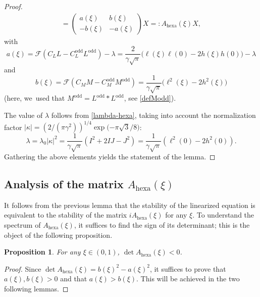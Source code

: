 \documentclass[JEP,XML,SOM,Unicode,NoFloatCountersInSection,published]{cedram}
\newtheorem{prop}[theorem]{Proposition}
\theoremstyle{definition}
\let\EE\exp
\newcommand{\pa}[1]{\left(#1\right)}
\begin{document}
\begin{proof}
\begin{multline}
=\begin{pmatrix} a(\xi) & b(\xi) \\[2pt] -b(\xi) & -a(\xi) \end{pmatrix}X
=:A_{\mathrm{hexa}}(\xi)X,
\end{multline}
with
\begin{equation}\label{def_a_hexa}
a(\xi) = \mathcal{F} \pa{C_L L- C_L^{\text{odd}}L^{\text{odd}}} -\lambda
= \frac{2}{\gamma\sqrt{\pi}}\bigl(\ell(\xi)\ell(0)-2h(\xi)h(0)\bigr) -\lambda
\end{equation}
and
\begin{equation}\label{def_b_hexa}
b(\xi) = \mathcal{F} \pa{C_M M- C_M^{\text{odd}}M^{\text{odd}}}
= \frac{1}{\gamma\sqrt{\pi}}\bigl({\ell^2(\xi)-2h^2(\xi)}\bigr)
\end{equation}
(here, we~used that $M^{\text{odd}} = L^{\text{odd}} * L^{\text{odd}}$, see \eqref{defModd}).

The value of $\lambda$ follows from \eqref{lambda-hexa}, taking into account the normalization factor $|\kappa|= \pa{2/{(\pi\gamma^2)}}^{1/4} \EE\bigl({-{\pi \sqrt{3}}/{8}}\bigr)$:
\begin{equation}\label{def_lambda_hexa}
\lambda = \lambda_0 |\kappa|^2=\frac{1}{\gamma\sqrt{\pi}}\pa{I^2+2IJ-J^2}=\frac{1}{\gamma\sqrt{\pi}}\pa{\ell^2(0)-2h^2(0)}.
\end{equation}
Gathering the above elements yields the statement of the lemma. \end{proof}

\subsection{Analysis of the matrix $A_{\mathrm{hexa}}(\xi)$}

It follows from the previous lemma that the stability of the linearized equation is equivalent to the stability of the matrix $iA_{\mathrm{hexa}}(\xi)$ for any $\xi$.
To understand the spectrum of $A_{\mathrm{hexa}}(\xi)$, it suffices to find the sign of its determinant; this is the object of the following proposition.

\begin{prop}\label{prop:5.4}
For any $\xi \in (0,1)$, $\det A_{\mathrm{hexa}}(\xi) < 0$.
\end{prop}

\begin{proof}
Since $\det A_{\mathrm{hexa}}(\xi) = b(\xi)^2 - a(\xi)^2$, it suffices to prove that $a(\xi),b(\xi)>0$ and that $a(\xi) > b(\xi)$. This will be achieved in the two following lemmas.\end{proof}
\end{document}
